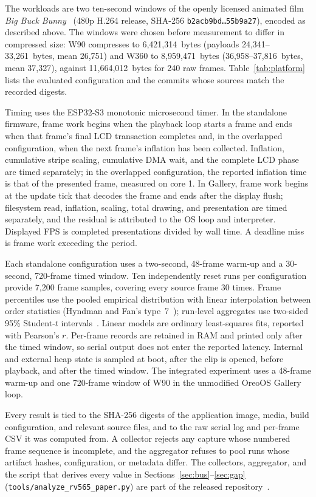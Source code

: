 \documentclass[11pt,twocolumn]{article}
\begin{document}
The workloads are two ten-second windows of the openly licensed animated film
\emph{Big Buck Bunny}~\cite{blender2008bbb} (480p H.264 release, SHA-256
\texttt{b2acb9bd\ldots 55b9a27}), encoded as described above.  The windows were
chosen before measurement to differ in compressed size: W90 compresses to
6,421,314~bytes (payloads 24,341--33,261~bytes, mean 26,751) and W360 to
8,959,471~bytes (36,958--37,816~bytes, mean 37,327), against 11,664,012~bytes
for 240 raw frames.  Table~\ref{tab:platform} lists the evaluated configuration
and the commits whose sources match the recorded digests.

Timing uses the ESP32-S3 monotonic microsecond timer.  In the standalone
firmware, frame work begins when the playback loop starts a frame and ends
when that frame's final LCD transaction completes and, in the overlapped
configuration, when the next frame's inflation has been collected.
Inflation, cumulative stripe scaling, cumulative DMA wait, and the complete
LCD phase are timed separately; in the overlapped configuration, the
reported inflation time is that of the presented frame, measured on core 1.
In Gallery, frame work begins at the update tick that decodes the frame and
ends after the display flush; filesystem read, inflation, scaling, total
drawing, and presentation are timed separately, and the residual is
attributed to the OS loop and interpreter.  Displayed FPS is completed
presentations divided by wall time.  A deadline miss is frame work exceeding
the period.

Each standalone configuration uses a two-second, 48-frame warm-up and a
30-second, 720-frame timed window.  Ten independently reset runs per
configuration provide 7,200 frame samples, covering every source frame 30
times.  Frame percentiles use the pooled empirical distribution with linear
interpolation between order statistics (Hyndman and Fan's
type~7~\cite{hyndman1996sample}); run-level aggregates use two-sided 95\%
Student-$t$ intervals~\cite{student1908probable}.  Linear models are ordinary
least-squares fits, reported with Pearson's $r$.  Per-frame records are
retained in RAM and printed only after the timed window, so serial output
does not enter the reported latency.  Internal and external heap state is
sampled at boot, after the clip is opened, before playback, and after the
timed window.  The integrated experiment uses a 48-frame warm-up and one
720-frame window of W90 in the unmodified OreoOS Gallery loop.

Every result is tied to the SHA-256 digests of the application image,
media, build configuration, and relevant source files, and to the raw serial
log and per-frame CSV it was computed from.  A collector rejects any capture
whose numbered frame sequence is incomplete, and the aggregator refuses to
pool runs whose artifact hashes, configuration, or metadata differ.  The
collectors, aggregator, and the script that derives every value in
Sections~\ref{sec:bus}--\ref{sec:gap} (\texttt{tools/analyze\_rv565\_paper.py})
are part of the released repository~\cite{bhattacharya2026oreo}.
\end{document}
